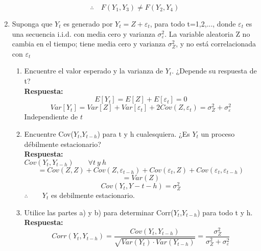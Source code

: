 \documentclass[12pt,letterpaper]{article}
\begin{document}
\begin{enumerate}
        \begin{equation*}
           \therefore \quad F(Y_{1},Y_{3}) \neq F(Y_{2},Y_{4})
        \end{equation*}





\item Suponga que $Y_{t}$ es generado por $Y_{t}=Z+\varepsilon_{t}$, para todo t=1,2,..., donde $\varepsilon_{t}$ es una secuencia i.i.d. con media cero y varianza $\sigma_{\varepsilon}^{2}$. La variable aleatoria Z no cambia en el tiempo; tiene media cero y varianza $\sigma_{Z}^{2}$, y no está correlacionada con $\varepsilon_{t}$
    \begin{enumerate}
        \item Encuentre el valor esperado y la varianza de $Y_{t}$. ¿Depende su respuesta de t?
        \\
        \textbf{Respuesta:}
        \begin{equation*}
            E[Y_{t}]=E[Z]+E[\varepsilon_{t}]=0
        \end{equation*}
        \begin{equation*}
            Var[Y_{t}]=Var[Z]+Var[\varepsilon_{t}]+2Cov(Z,\varepsilon_{t})=\sigma_{Z}^{2}+\sigma_{\varepsilon}^{2}
        \end{equation*}
        Independiente de $t$



        \item Encuentre Cov($Y_{t}$,$Y_{t-h}$) para t y h cualesquiera. ¿Es $Y_{t}$ un proceso débilmente estacionario?
        \\
        \textbf{Respuesta:}
        \\
        $Cov(Y_{t},Y_{t-h})\quad\quad \forall t~y~h$
        \begin{equation*}
            =Cov(Z,Z)+Cov(Z,\varepsilon_{t-h})+Cov(\varepsilon_{t},Z)+Cov(\varepsilon_{t},\varepsilon_{t-h})
        \end{equation*}
        \begin{equation*}
            =Var(Z)
        \end{equation*}
        \begin{equation*}
             Cov(Y_{t},Y-{t-h})=\sigma_{Z}^{2}
        \end{equation*}
        $\therefore \quad\quad Y_{t}$ es debilmente estacionario.


        \item Utilice las partes a) y b) para determinar Corr($Y_{t}$,$Y_{t-h}$) para todo t y h.
        \\
        \textbf{Respuesta:}
        \begin{equation*}
            Corr(Y_{t},Y_{t-h})=\frac{Cov(Y_{t},Y_{t-h})}{\sqrt{Var(Y_{t})\cdot Var(Y_{t-h})}}=\frac{\sigma_{Z}^{2}}{\sigma_{Z}^{2}+\sigma_{\varepsilon}^{2}}
        \end{equation*}


\end{enumerate}
\end{enumerate}
\end{document}
